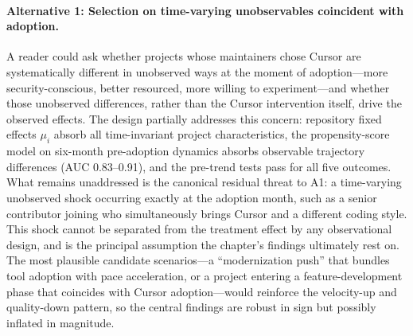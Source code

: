 \paragraph{Alternative 1: Selection on time-varying unobservables coincident with adoption.}
A reader could ask whether projects whose maintainers chose Cursor are systematically different in unobserved ways at the moment of adoption---more security-conscious, better resourced, more willing to experiment---and whether those unobserved differences, rather than the Cursor intervention itself, drive the observed effects.
The design partially addresses this concern: repository fixed effects $\mu_i$ absorb all time-invariant project characteristics, the propensity-score model on six-month pre-adoption dynamics absorbs observable trajectory differences (AUC 0.83--0.91), and the pre-trend tests pass for all five outcomes.
What remains unaddressed is the canonical residual threat to A1: a time-varying unobserved shock occurring exactly at the adoption month, such as a senior contributor joining who simultaneously brings Cursor and a different coding style.
This shock cannot be separated from the treatment effect by any observational design, and is the principal assumption the chapter's findings ultimately rest on.
The most plausible candidate scenarios---a ``modernization push'' that bundles tool adoption with pace acceleration, or a project entering a feature-development phase that coincides with Cursor adoption---would reinforce the velocity-up and quality-down pattern, so the central findings are robust in sign but possibly inflated in magnitude.


